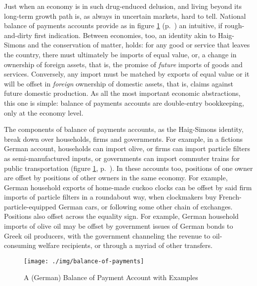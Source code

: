 \documentclass[11pt,a4paper,oneside]{article}
\begin{document}
Just when an economy is in such drug-enduced delusion, and living beyond its long-term growth path is, as always in uncertain markets, hard to tell.
National balance of payments accounts provide as in figure \ref{fig:balance-of-payments} (p.~\pageref{fig:balance-of-payments}) an intuitive, if rough-and-dirty first indication.
Between economies, too, an identity akin to Haig-Simons and the conservation of matter, holds:
for any good or service that leaves the country, there must ultimately be imports of equal value, or, a change in ownership of foreign assets, that is, the promise of \emph{future} imports of goods and services.
Conversely, any import must be matched by exports of equal value or it will be offset in \emph{foreign} ownership of domestic assets, that is, claims against future domestic production.
As all the most important economic abstractions, this one is simple:
balance of payments accounts are double-entry bookkeeping, only at the economy level.

The components of balance of payments accounts, as the Haig-Simons identity, break down over households, firms and governments.
For example, in a fictions German account, households can import olive, or firms can import particle filters as semi-manufactured inputs, or governments can import commuter trains for public transportation (figure \ref{fig:balance-of-payments}, p.~\pageref{fig:balance-of-payments}).
In these accounts too, positions of one owner are offset by positions of other owners in the same economy.
For example, German household exports of home-made cuckoo clocks can be offset by said firm imports of particle filters in a roundabout way, when clockmakers buy French-particle-equipped German cars, or following some other chain of exchanges.
Positions  also offset across the equality sign.
For example, German household imports of olive oil may be offset by government issues of German bonds to Greek oil producers, with the government channeling the revenue to oil-consuming welfare recipients, or through a myriad of other transfers.

\begin{figure}[htbp]
	\begin{center}
	\texttt{[image: ./img/balance-of-payments]}
	\caption{A (German) Balance of Payment Account with Examples}
	\label{fig:balance-of-payments}
	\end{center}
\end{figure}
\end{document}
